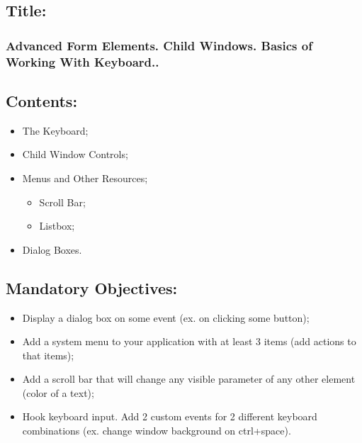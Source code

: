 \documentclass[12pt]{article}
\begin{document}
        \pagebreak
        \subsection*{Title:}
        \subsubsection*{Advanced Form Elements. Child Windows. Basics of Working With Keyboard.. }
        \subsection*{Contents:}
        \begin{itemize}
                \item The Keyboard;
                \item Child Window Controls;
                \item Menus and Other Resources;
                \begin{itemize}
                        \item Scroll Bar;
                        \item Listbox;
                \end{itemize}
                \item Dialog Boxes.
        \end{itemize}
       
        \subsection*{Mandatory Objectives:}
        \begin{itemize}
                \item Display a dialog box on some event (ex. on clicking some button);
                \item Add a system menu to your application with at least 3 items (add actions to that items);
                \item Add a scroll bar that will change any visible parameter of any other element (color of a text);
                \item Hook keyboard input. Add 2 custom events for 2 different keyboard combinations (ex. change window background on ctrl+space).
        \end{itemize}
\end{document}
